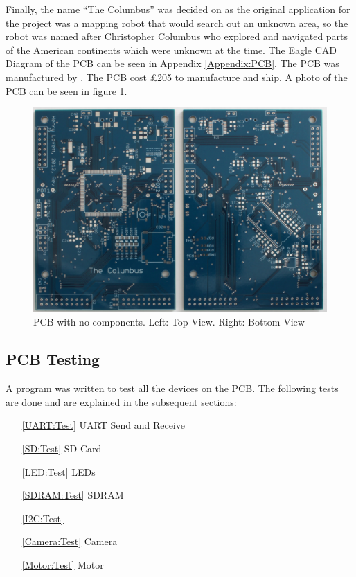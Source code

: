 Finally, the name ``The Columbus'' was decided on as the original application for the project was a mapping robot that would search out an unknown area, so the robot was named after Christopher Columbus who explored and navigated parts of the American continents which were unknown at the time. The Eagle CAD Diagram of the PCB can be seen in Appendix \ref{Appendix:PCB}. The PCB was manufactured by \cite{PCBCart}. The PCB cost \pounds 205 to manufacture and ship. A photo of the PCB can be seen in figure \ref{fig:PCB:Bare}. 

\begin{figure}
\includegraphics[width=\textwidth]{./Figures/PCB_Bare.jpg}
\caption{PCB with no components. Left: Top View. Right: Bottom View}
\label{fig:PCB:Bare}
\end{figure}


\subsection{PCB Testing}
A program was written to test all the devices on the PCB. The following tests are done and are explained in the subsequent sections:
\begin{enumerate}
\item[\ref{UART:Test}] UART Send and Receive
\item[\ref{SD:Test}] SD Card 
\item[\ref{LED:Test}] LEDs 
\item[\ref{SDRAM:Test}] SDRAM 
\item[\ref{I2C:Test}] \itc 
\item[\ref{Camera:Test}] Camera 
\item[\ref{Motor:Test}] Motor 
\end{enumerate}


